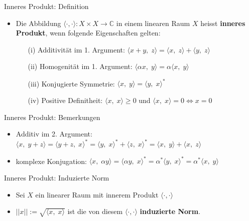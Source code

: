 \documentclass[14pt, aspectratio=169, handout]{beamer}
\begin{document}
\begin{frame}{Inneres Produkt: Definition}
    \begin{itemize}
        \item Die Abbildung $\langle \cdot, \cdot \rangle : X \times X \to \mathbb{C}$ in einem linearen Raum $X$ heisst \textbf{inneres Produkt}, wenn folgende Eigenschaften gelten:
            \begin{itemize}
            \item[] 
            \item[(i)] Additivität im 1. Argument: $\langle x + y, \; z\rangle = \langle x, \; z\rangle + \langle y, \; z\rangle$
            \item[] 
            \item[(ii)] Homogenität im 1. Argument: $\langle \alpha x, \; y \rangle = \alpha \langle x, \; y \rangle$
            \item[] 
            \item[(iii)] Konjugierte Symmetrie: $\langle x, \; y\rangle = \langle y, \; x\rangle^*$
            \item[] 
            \item[(iv)] Positive Definitheit: $\langle x, \; x\rangle \geq 0$ und $\langle x, \; x\rangle = 0 \Leftrightarrow x = 0$
            \end{itemize}
    \end{itemize}
\end{frame}

\begin{frame}{Inneres Produkt: Bemerkungen}
    \begin{itemize}
        \item Additiv im 2. Argument: $\langle x, \; y+z \rangle = \langle y + z, \; x \rangle^* = \langle y, \; x \rangle^* + \langle z, \; x \rangle^* = \langle x, \; y \rangle + \langle x, \; z \rangle$
        \item[] 
        \item komplexe Konjugation: $\langle x, \; \alpha y\rangle = \langle \alpha y, \; x \rangle^* = \alpha^* \langle y, \; x \rangle^* = \alpha^* \langle x, \; y \rangle$
    \end{itemize}
\end{frame}

\begin{frame}{Inneres Produkt: Induzierte Norm}
    \begin{itemize}
        \item Sei $X$ ein linearer Raum mit innerem Produkt $\langle \cdot, \cdot\rangle$
        \item[] 
        \item $||x|| := \sqrt{\langle x, \; x\rangle}$ ist die von diesem $\langle \cdot, \cdot\rangle$ \textbf{induzierte Norm}.
    \end{itemize}
\end{frame}
\end{document}
